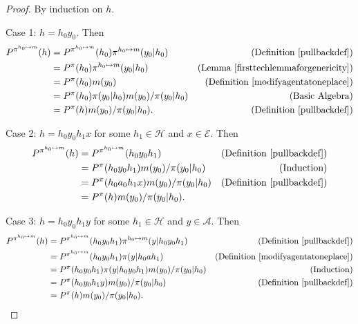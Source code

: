 \documentclass[twoside]{article}
\begin{document}
\begin{proof}
    By induction on $h$.

    Case 1: $h=h_0y_0$. Then
    \begin{align*}
        P^{\pi^{h_0\mapsto m}}(h)
        &= P^{\pi^{h_0\mapsto m}}(h_0)\pi^{h_0\mapsto m}(y_0|h_0)
            &\mbox{(Definition \ref{pullbackdef})}\\
        &= P^\pi(h_0)\pi^{h_0\mapsto m}(y_0|h_0)
            &\mbox{(Lemma \ref{firsttechlemmaforgenericity})}\\
        &= P^\pi(h_0)m(y_0)
            &\mbox{(Definition \ref{modifyagentatoneplace})}\\
        &= P^\pi(h_0)\pi(y_0|h_0)m(y_0)/\pi(y_0|h_0)
            &\mbox{(Basic Algebra)}\\
        &= P^\pi(h)m(y_0)/\pi(y_0|h_0).
            &\mbox{(Definition \ref{pullbackdef})}
    \end{align*}

    Case 2: $h=h_0 y_0 h_1 x$ for some $h_1\in\mathcal H$
        and $x\in\mathcal E$. Then
    \begin{align*}
        P^{\pi^{h_0\mapsto m}}(h)
        &= P^{\pi^{h_0\mapsto m}}(h_0 y_0 h_1)
            &\mbox{(Definition \ref{pullbackdef})}\\
        &= P^\pi(h_0 y_0 h_1)m(y_0)/\pi(y_0|h_0)
            &\mbox{(Induction)}\\
        &= P^\pi(h_0 a_0 h_1 x)m(y_0)/\pi(y_0|h_0)
            &\mbox{(Definition \ref{pullbackdef})}\\
        &= P^\pi(h)m(y_0)/\pi(y_0|h_0).
    \end{align*}

    Case 3: $h=h_0 y_0 h_1 y$ for some $h_1\in\mathcal H$ and
        $y\in\mathcal A$. Then
    \begin{align*}
        P^{\pi^{h_0\mapsto m}}(h)
        &= P^{\pi^{h_0\mapsto m}}(h_0 y_0 h_1)
            \pi^{h_0\mapsto m}(y|h_0 y_0 h_1)
            &\mbox{(Definition \ref{pullbackdef})}\\
        &= P^{\pi^{h_0\mapsto m}}(h_0 y_0 h_1)
            \pi(y|h_0 a h_1)
            &\mbox{(Definition \ref{modifyagentatoneplace})}\\
        &= P^\pi(h_0 y_0 h_1)\pi(y|h_0 y_0 h_1)m(y_0)/\pi(y_0|h_0)
            &\mbox{(Induction)}\\
        &= P^\pi(h_0 y_0 h_1 y)m(y_0)/\pi(y_0|h_0)
            &\mbox{(Definition \ref{pullbackdef})}\\
        &= P^\pi(h)m(y_0)/\pi(y_0|h_0).
    \end{align*}
\end{proof}
\end{document}
